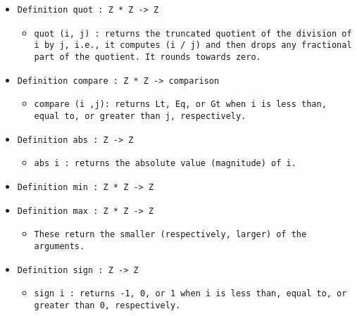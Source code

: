 \documentclass[11pt]{report}
\begin{document}
\begin{itemize}
\item  \texttt{Definition quot : Z * Z -> Z}

\begin{itemize}
\item \begin{flushleft} \texttt{quot (i, j) : returns the truncated quotient of the division of i by j, i.e., it computes (i / j) and then drops any fractional part of the quotient. It rounds towards zero.} \end{flushleft}
\end{itemize}

\item  \texttt{Definition compare : Z * Z -> comparison}

\begin{itemize}
\item  \begin{flushleft} \texttt{compare (i ,j): returns Lt, Eq, or Gt when i is less than, equal to, or greater than j, respectively.} \end{flushleft}

\end{itemize}

\item  \texttt{Definition abs : Z -> Z}

\begin{itemize}
\item  \texttt{abs i : returns the absolute value (magnitude) of i.}



\end{itemize}

\item  \texttt{Definition min : Z * Z -> Z}

\item  \texttt{Definition max : Z * Z -> Z}

\begin{itemize}
\item   \texttt{These return the smaller (respectively, larger) of the arguments.}



\end{itemize}

\item  \texttt{Definition sign : Z -> Z}

\begin{itemize}
\item  \begin{flushleft} \texttt{sign i : returns -1, 0, or 1 when i is less than, equal to, or greater than 0, respectively.} \end{flushleft}


\end{itemize}
\end{itemize}
\end{document}
